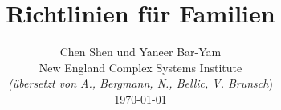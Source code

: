 \documentclass[onecolumn,journal]{IEEEtran}
\begin{document}
\title{\color{Brown} Richtlinien für Familien \\
\vspace{-0.35ex}}
\author{Chen Shen und Yaneer Bar-Yam \\ New England Complex Systems Institute \\
\vspace{+0.35ex}
\small{\textit{(übersetzt von A., Bergmann, N., Bellic, V. Brunsch})}\\
 \today
  \vspace{-14ex} \\


\bigskip
\bigskip

\textbf{}
 }

\maketitle


\flushbottom %



\thispagestyle{empty} %




\renewcommand{\thefootnote}{\fnsymbol{footnote}}
\end{document}
